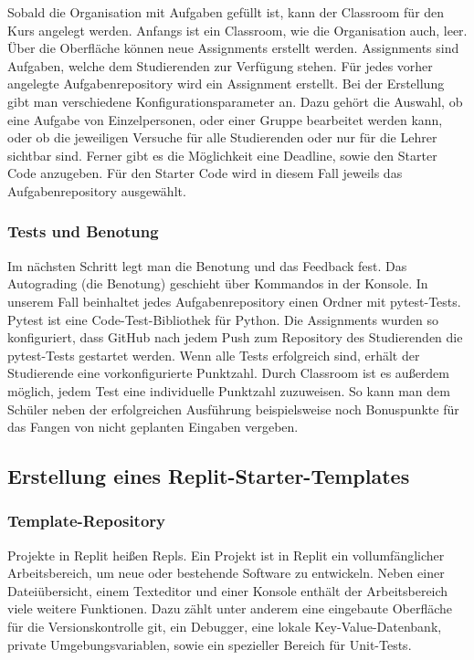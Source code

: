 Sobald die Organisation mit Aufgaben gefüllt ist, kann der
Classroom für den Kurs angelegt werden. Anfangs ist ein Classroom, wie die
Organisation auch, leer. Über die Oberfläche können neue Assignments
erstellt werden. Assignments sind Aufgaben, welche dem Studierenden zur
Verfügung stehen. Für jedes vorher angelegte Aufgabenrepository wird ein
Assignment erstellt. Bei der Erstellung gibt man verschiedene
Konfigurationsparameter an. Dazu gehört die Auswahl, ob eine Aufgabe von
Einzelpersonen, oder einer Gruppe bearbeitet werden kann, oder ob die jeweiligen
Versuche für alle Studierenden oder nur für die Lehrer sichtbar sind. Ferner
gibt es die Möglichkeit eine Deadline, sowie den Starter Code anzugeben. Für den
Starter Code wird in diesem Fall jeweils das Aufgabenrepository ausgewählt.
\parencite{github-assignment-erstellen}

\subsubsection{Tests und Benotung}\label{classroom-tests}
Im nächsten Schritt legt man die Benotung und das Feedback fest. Das Autograding
(die Benotung) geschieht über Kommandos in der Konsole. In unserem Fall
beinhaltet jedes Aufgabenrepository einen Ordner mit pytest-Tests. Pytest ist
eine Code-Test-Bibliothek für Python. Die Assignments wurden so konfiguriert,
dass GitHub nach jedem Push zum Repository des Studierenden die pytest-Tests
gestartet werden. Wenn alle Tests erfolgreich sind, erhält der Studierende eine
vorkonfigurierte Punktzahl. Durch Classroom ist es außerdem möglich, jedem
Test eine individuelle Punktzahl zuzuweisen. So kann man dem Schüler neben der
erfolgreichen Ausführung beispielsweise noch Bonuspunkte für das Fangen von
nicht geplanten Eingaben vergeben. \parencite{github-assignment-erstellen}


\subsection{Erstellung eines Replit-Starter-Templates}\label{replit-template}
\subsubsection{Template-Repository}\label{replit-template-repository}
Projekte in Replit heißen Repls. Ein Projekt ist in Replit ein vollumfänglicher
Arbeitsbereich, um neue oder bestehende Software zu entwickeln. Neben einer
Dateiübersicht, einem Texteditor und einer Konsole enthält der Arbeitsbereich
viele weitere Funktionen. Dazu zählt unter anderem eine eingebaute Oberfläche
für die Versionskontrolle git, ein Debugger, eine lokale Key-Value-Datenbank,
private Umgebungsvariablen, sowie ein spezieller Bereich für Unit-Tests.

